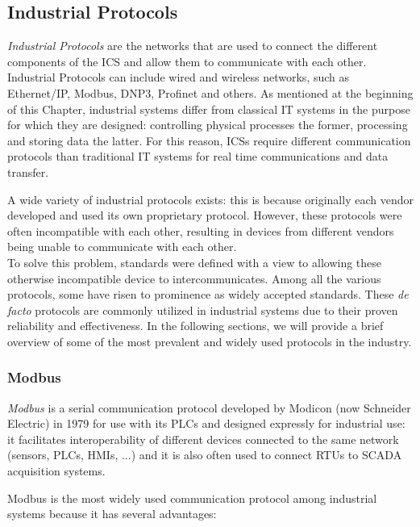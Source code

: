 \subsection{Industrial Protocols}
\label{subsec:2_ot_communication_networks}
\textit{Industrial Protocols} are the networks that are used to connect the different components of the ICS and allow them to communicate with each other. Industrial Protocols can include wired and wireless networks, such as Ethernet/IP, Modbus, DNP3, Profinet and others.\newline
As mentioned at the beginning of this Chapter, industrial systems differ from classical IT systems in the purpose for which they are designed: controlling physical processes the former, processing and storing data the latter. For this reason, ICSs require different communication protocols than traditional IT systems for real time communications and data transfer.

\bigskip
A wide variety of industrial protocols exists: this is because originally each vendor developed and used its own proprietary protocol. However, these protocols were often incompatible with each other, resulting in devices from different vendors being unable to communicate with each other.
\\To solve this problem, standards were defined with a view to allowing these otherwise incompatible device to intercommunicates.\newline
Among all the various protocols, some have risen to prominence as widely accepted standards. These \textit{de facto} protocols are commonly utilized in industrial systems due to their proven reliability and effectiveness. In the following sections, we will provide a brief overview of some of the most prevalent and widely used protocols in the industry.
\vfill

\subsubsection{Modbus}
\label{subsec:2_modbus}
\textit{Modbus} is a serial communication protocol developed by Modicon (now Schneider Electric) in 1979 for use with its PLCs \cite{Modbus_definition} and designed expressly for industrial use: it facilitates interoperability of different devices connected to the same network (sensors, PLCs, HMIs, ...) and it is also often used to connect RTUs to SCADA acquisition systems.

\bigskip
Modbus is the most widely used communication protocol among industrial systems because it has several advantages:

